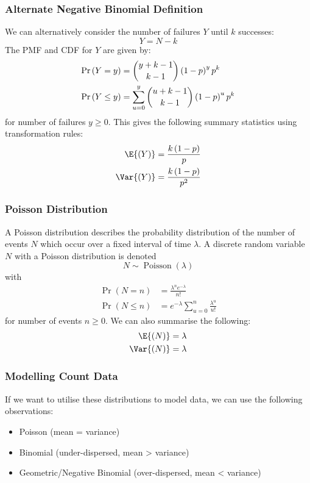 \documentclass{article}
\begin{document}
\subsubsection{Alternate Negative Binomial Definition}
We can alternatively consider the number of failures \(Y\) until \(k\)
successes:
\begin{equation*}
    Y = N - k
\end{equation*}
The PMF and CDF for \(Y\) are given by:
\begin{align*}
    \Pr{\left( Y = y \right)}    & = \dbinom{y + k - 1}{k - 1} \left( 1 - p \right)^y p^k                \\
    \Pr{\left( Y \leq y \right)} & = \sum_{u = 0}^y \dbinom{u + k - 1}{k - 1} \left( 1 - p \right)^u p^k
\end{align*}
for number of failures \(y \geq 0\). This gives the following summary
statistics using transformation rules:
\begin{align*}
    \E{\left( Y \right)}   & = \frac{k \left( 1 - p \right)}{p}   \\
    \Var{\left( Y \right)} & = \frac{k \left( 1 - p \right)}{p^2}
\end{align*}
\subsubsection{Poisson Distribution}
A Poisson distribution describes the probability distribution of the
number of events \(N\) which occur over a fixed interval of time
\(\lambda\). A discrete random variable \(N\) with a Poisson
distribution is denoted
\begin{equation*}
    N \sim \operatorname{Poisson}{\left( \lambda \right)}
\end{equation*}
with
\begin{align*}
    \Pr{\left( N = n \right)}    & = \frac{\lambda^n e^{-\lambda}}{n!}                \\
    \Pr{\left( N \leq n \right)} & = e^{-\lambda} \sum_{u = 0}^n \frac{\lambda^u}{u!}
\end{align*}
for number of events \(n \geq 0\). We can also summarise the following:
\begin{align*}
    \E{\left( N \right)}   & = \lambda \\
    \Var{\left( N \right)} & = \lambda
\end{align*}
\subsubsection{Modelling Count Data}
If we want to utilise these distributions to model data, we can use the
following observations:
\begin{itemize}
    \item Poisson (mean = variance)
    \item Binomial (under-dispersed, mean > variance)
    \item Geometric/Negative Binomial (over-dispersed, mean < variance)
\end{itemize}
\end{document}
